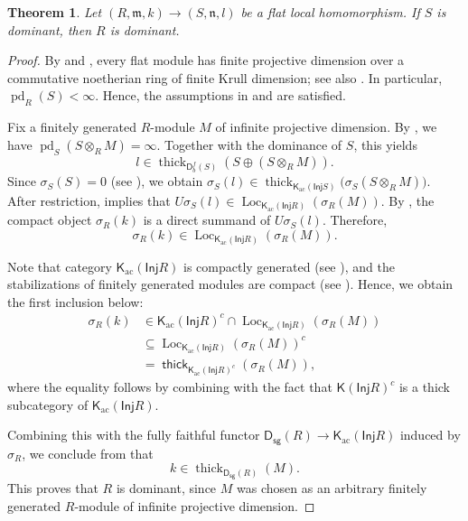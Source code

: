 \documentclass{amsart}
\newcommand{\D}{\mathsf{D}}
\newcommand{\K}{\mathsf{K}}
\newcommand{\0}{{\bf{0}}}
\DeclareMathOperator{\pd}{pd}
\DeclareMathOperator{\ac}{ac}
\DeclareMathOperator{\thick}{\mathsf{thick}}
\newcommand{\sg}{\mathsf{sg}}
\newcommand{\Inj}{\mathsf{Inj}}
\newtheorem{theorem}{Theorem}[section]
\theoremstyle{definition}
\begin{document}
\begin{theorem}\label{extension}
Let
$
(R,\mathfrak m,k)\longrightarrow(S,\mathfrak n,l)
$
be a flat local homomorphism.
If \(S\) is dominant, then \(R\) is dominant. 
\end{theorem}
\begin{proof}
By \cite[Theorem 3.2.6]{RG} and \cite[Proposition 6]{Jensen}, every flat module has finite projective dimension over a commutative noetherian ring of finite Krull dimension; see also \cite[Proposition 5.9]{DKLO}. In particular, $\pd_R(S)<\infty$. Hence, the assumptions in  and  are satisfied.

Fix a finitely generated \(R\)-module \(M\) of infinite projective dimension. By , we have
$
\operatorname{pd}_S(S\otimes_RM)=\infty.
$
Together with the dominance of $S$, this yields
\[
l\in
\operatorname{thick}_{\D^f_b(S)}
(S\oplus (S\otimes_RM)).
\]
Since $\sigma_S(S)=0$ (see ), we obtain
$
\sigma_S(l)\in
\operatorname{thick}_{\K_{\ac}(\Inj S)}
\bigl(\sigma_S(S\otimes_RM)\bigr).
$
After restriction,  implies that
$
U\sigma_S(l)\in
\operatorname{Loc}_{\K_{\ac}(\Inj R)}(\sigma_R(M)).
$
By , the compact object \(\sigma_R(k)\) is a direct summand of \(U\sigma_S(l)\). Therefore,
$$
\sigma_R(k) \in
\operatorname{Loc}_{\K_{\ac}(\Inj R)}(\sigma_R(M)).
$$

Note that category \(\K_{\ac}(\Inj R)\) is compactly generated (see ), and the stabilizations of finitely generated modules are compact (see ). Hence, we obtain the first inclusion below:
\begin{align*}
   \sigma_R(k) &\in
\K_{\ac}(\Inj R)^c\cap \operatorname{Loc}_{\K_{\ac}(\Inj R)}
 (\sigma_R(M))\\
 & \subseteq \operatorname{Loc}_{\K_{\ac}(\Inj R)}
 (\sigma_R(M))^c\\
& =\thick_{\K_{\ac}(\Inj R)^c}(\sigma_R(M)), 
\end{align*}
where the equality follows by combining  with the fact that $\K(\Inj R)^c$ is a thick subcategory of $\K_{\ac}(\Inj R)$.

Combining this with the fully faithful functor $\D_{\sg}(R)\to \K_{\ac}(\Inj R)$ induced by $\sigma_R$, we conclude from \cite[Proposition 3.15]{DLL} that
\[
k\in
\operatorname{thick}_{\D_{\sg}(R)}(M).
\]
This proves that $R$ is dominant, since $M$ was chosen as an arbitrary finitely generated $R$-module of infinite projective dimension.
\end{proof}
\end{document}
